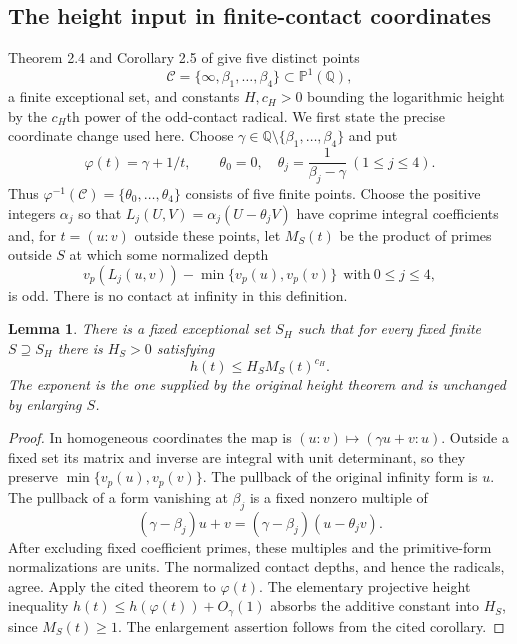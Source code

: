 \documentclass[11pt,reqno]{amsart}
\newtheorem{lemma}[theorem]{Lemma}
\theoremstyle{definition}
\numberwithin{equation}{section}
\newcommand{\Q}{\mathbb Q}
\def\t{\text}
\begin{document}
\subsection{The height input in finite-contact coordinates}
Theorem 2.4 and Corollary 2.5 of \cite{OAI} give five distinct points
\[
 \mathcal C=\{\infty,\beta_1,\ldots,\beta_4\}\subset\mathbb P^1(\Q),
\]
a finite exceptional set, and constants $H,c_H>0$ bounding the logarithmic height by the $c_H$th power of the odd-contact radical. We first state the precise coordinate change used here. Choose $\gamma\in\Q\setminus\{\beta_1,\ldots,\beta_4\}$ and put
\begin{equation}\label{eq:contactchange}
 \varphi(t)=\gamma+1/t,\qquad
 \theta_0=0,\quad\theta_j=\frac1{\beta_j-\gamma}\ (1\le j\le4).
\end{equation}
Thus $\varphi^{-1}(\mathcal C)=\{\theta_0,\ldots,\theta_4\}$ consists of five finite points. Choose the positive integers $\alpha_j$ so that $L_j(U,V)=\alpha_j(U-\theta_jV)$ have coprime integral coefficients and, for $t=(u:v)$ outside these points, let $M_S(t)$ be the product of primes outside $S$ at which some normalized depth
\begin{equation}\label{eq:contactdepth}
 v_p(L_j(u,v))-\min\{v_p(u),v_p(v)\}\ \ \t{with}\ 0\le j\le4,
\end{equation}
is odd. There is no contact at infinity in this definition.

\begin{lemma}\label{lem:heightchange}
There is a fixed exceptional set $S_H$ such that for every fixed finite $S\supseteq S_H$ there is $H_S>0$ satisfying
\begin{equation}\label{eq:heightinput}
 h(t)\le H_S M_S(t)^{c_H}.
\end{equation}
The exponent is the one supplied by the original height theorem and is unchanged by enlarging $S$.
\end{lemma}
\begin{proof}
In homogeneous coordinates the map is $(u:v)\mapsto(\gamma u+v:u)$. Outside a fixed set its matrix and inverse are integral with unit determinant, so they preserve $\min\{v_p(u),v_p(v)\}$. The pullback of the original infinity form is $u$. The pullback of a form vanishing at $\beta_j$ is a fixed nonzero multiple of
\[
 (\gamma-\beta_j)u+v=(\gamma-\beta_j)(u-\theta_jv).
\]
After excluding fixed coefficient primes, these multiples and the primitive-form normalizations are units. The normalized contact depths, and hence the radicals, agree. Apply the cited theorem to $\varphi(t)$. The elementary projective height inequality $h(t)\le h(\varphi(t))+O_\gamma(1)$ absorbs the additive constant into $H_S$, since $M_S(t)\ge1$. The enlargement assertion follows from the cited corollary.
\end{proof}
\end{document}

